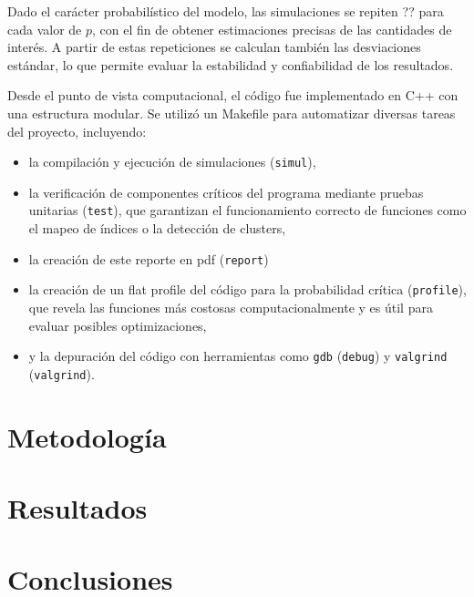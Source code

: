 \documentclass[12pt,a4paper,twoside]{tau-book}
\begin{document}
Dado el carácter probabilístico del modelo, las simulaciones se repiten ?? para cada valor de $p$, con el fin de obtener estimaciones precisas de las cantidades de interés. A partir de estas repeticiones se calculan también las desviaciones estándar, lo que permite evaluar la estabilidad y confiabilidad de los resultados.

Desde el punto de vista computacional, el código fue implementado en C++ con una estructura modular. Se utilizó un Makefile para automatizar diversas tareas del proyecto, incluyendo:
\begin{itemize}
    \item la compilación y ejecución de simulaciones (\texttt{simul}),
    \item la verificación de componentes críticos del programa mediante pruebas unitarias (\texttt{test}), que garantizan el funcionamiento correcto de funciones como el mapeo de índices o la detección de clusters,
    \item la creación de este reporte en pdf (\texttt{report})
    \item la creación de un flat profile del código para la probabilidad crítica (\texttt{profile}), que revela las funciones más costosas computacionalmente y es útil para evaluar posibles optimizaciones,
    \item y la depuración del código con herramientas como \texttt{gdb} (\texttt{debug}) y \texttt{valgrind} (\texttt{valgrind}).
\end{itemize}


\section{Metodología}


\section{Resultados}


\section{Conclusiones}




\printbibliography

\appendix
\end{document}
